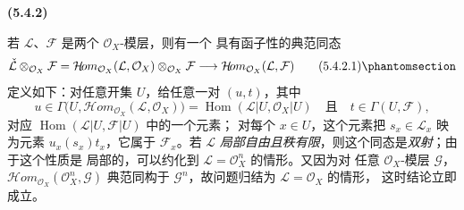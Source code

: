 \documentclass[UTF8,fontset=none,11pt,oneside,openany]{ctexbook}
\newenvironment{env}[1][]{%
  \par\medskip\noindent\textbf{(#1)}\ %
}{\par}
\let\EGAOriginalLabel\label
\renewcommand{\label}[1]{\phantomsection\EGAOriginalLabel{#1}}
\begin{document}
\begin{env}[5.4.2]
\label{0.5.4.2-fr}
若 $\mathcal{L}$、$\mathcal{F}$ 是两个 $\mathcal{O}_X$-模层，则有一个
具有函子性的典范同态
\[
  \check{\mathcal{L}}\otimes_{\mathcal{O}_X}\mathcal{F}
  =\mathcal{H}\!om_{\mathcal{O}_X}(\mathcal{L},\mathcal{O}_X)
   \otimes_{\mathcal{O}_X}\mathcal{F}
  \longrightarrow
  \mathcal{H}\!om_{\mathcal{O}_X}(\mathcal{L},\mathcal{F})
  \tag{5.4.2.1}\label{0.5.4.2.1-fr}
\]
定义如下：对任意开集 $U$，给任意一对 $(u,t)$，其中
\[
  u\in\Gamma\bigl(U,
    \mathcal{H}\!om_{\mathcal{O}_X}(\mathcal{L},\mathcal{O}_X)\bigr)
  =\operatorname{Hom}(\mathcal{L}|U,\mathcal{O}_X|U)
  \quad\text{且}\quad
  t\in\Gamma(U,\mathcal{F}),
\]
对应 $\operatorname{Hom}(\mathcal{L}|U,\mathcal{F}|U)$ 中的一个元素；
对每个 $x\in U$，这个元素把 $s_x\in\mathcal{L}_x$ 映为元素
$u_x(s_x)t_x$，它属于 $\mathcal{F}_x$。若 $\mathcal{L}$
\emph{局部自由且秩有限}，则这个同态是\emph{双射}；由于这个性质是
局部的，可以约化到 $\mathcal{L}=\mathcal{O}_X^n$ 的情形。又因为对
任意 $\mathcal{O}_X$-模层 $\mathcal{G}$，
$\mathcal{H}\!om_{\mathcal{O}_X}(\mathcal{O}_X^n,\mathcal{G})$ 典范同构于
$\mathcal{G}^n$，故问题归结为 $\mathcal{L}=\mathcal{O}_X$ 的情形，
这时结论立即成立。
\end{env}
\end{document}
